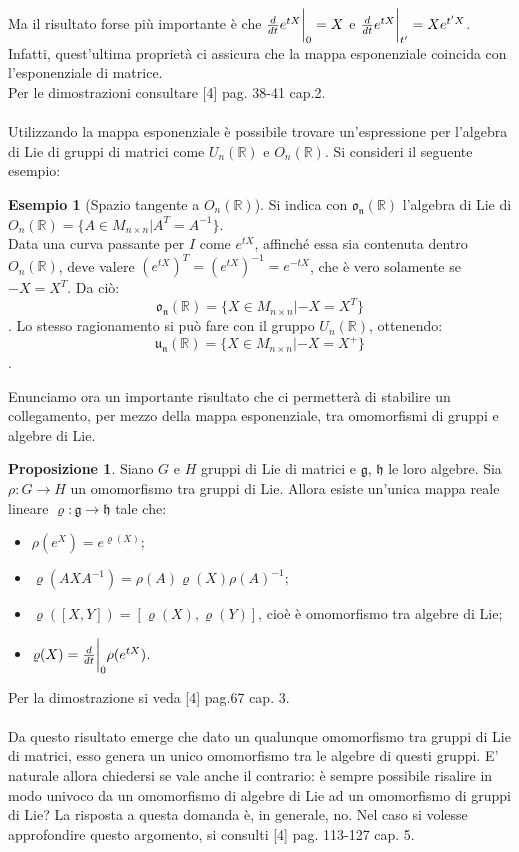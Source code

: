 \documentclass[12pt,a4paper]{report}
\theoremstyle{definition}
\newtheorem{Prop}[Def]{Proposizione}
\theoremstyle{definition}
\newtheorem{Ex}[Def]{Esempio}
\theoremstyle{definition}
\theoremstyle{remark}
\begin{document}
Ma il risultato forse più importante è che ${d\over dt}e^{tX}\bigg{\rvert}_0=X$ e ${d\over dt}e^{tX}\bigg{\rvert}_{t'}=Xe^{t'X}$.\\
Infatti, quest'ultima proprietà ci assicura che la mappa esponenziale coincida con l'esponenziale di matrice.\\
Per le dimostrazioni consultare [4] pag. 38-41 cap.2.\\
\\
Utilizzando la mappa esponenziale è possibile trovare un'espressione per l'algebra di Lie di gruppi di matrici come $U_n(\mathbb{R})$ e $O_n(\mathbb{R})$. Si consideri il seguente esempio:
\begin{Ex}[Spazio tangente a $O_n(\mathbb{R})$]
	Si indica con $\mathfrak{o_n(\mathbb{R})}$ l'algebra di Lie di $O_n(\mathbb{R})=\{A\in M_{n\times n}|A^T=A^{-1}\}$.\\
	Data una curva passante per $I$ come $e^{tX}$, affinché essa sia contenuta dentro $O_n(\mathbb{R})$, deve valere $(e^{tX})^T=(e^{tX})^{-1}=e^{-tX}$, che è vero solamente se $-X=X^T$. Da ciò: $$\mathfrak{o_n(\mathbb{R})}=\{X\in M_{n\times n}|-X=X^T\}$$.
	Lo stesso ragionamento si può fare con il gruppo $U_n(\mathbb{R})$, ottenendo: $$\mathfrak{u_n(\mathbb{R})}=\{X\in M_{n\times n}|-X=X^+\}$$.
\end{Ex}
Enunciamo ora un importante risultato che ci permetterà di stabilire un collegamento, per mezzo della mappa esponenziale, tra omomorfismi di gruppi e algebre di Lie.
\begin{Prop}
	Siano $G$ e $H$ gruppi di Lie di matrici e $\mathfrak{g}$, $\mathfrak{h}$ le loro algebre. Sia $\rho:G\rightarrow H$ un omomorfismo tra gruppi di Lie. Allora esiste un'unica mappa reale lineare $\varrho:\mathfrak{g}\rightarrow\mathfrak{h}$ tale che:
	\begin{itemize}
		\item $\rho(e^X)=e^{\varrho(X)}$; 
		\item $\varrho(AXA^{-1})=\rho(A)\varrho(X)\rho(A)^{-1}$;
		\item $\varrho([X,Y])=[\varrho(X),\varrho(Y)]$, cioè è omomorfismo tra algebre di Lie;
		\item $\varrho(X)={d\over dt}\bigg{\rvert}_0\rho(e^{tX})$.
	\end{itemize}
\end{Prop}
Per la dimostrazione si veda [4] pag.67 cap. 3.\\
\\
Da questo risultato emerge che dato un qualunque omomorfismo tra gruppi di Lie di matrici, esso genera un unico omomorfismo tra le algebre di questi gruppi. E' naturale allora chiedersi se vale anche il contrario: è sempre possibile risalire in modo univoco da un omomorfismo di algebre di Lie ad un omomorfismo di gruppi di Lie?
La risposta a questa domanda è, in generale, no. Nel caso si volesse approfondire questo argomento, si consulti [4] pag. 113-127 cap. 5.
\end{document}
